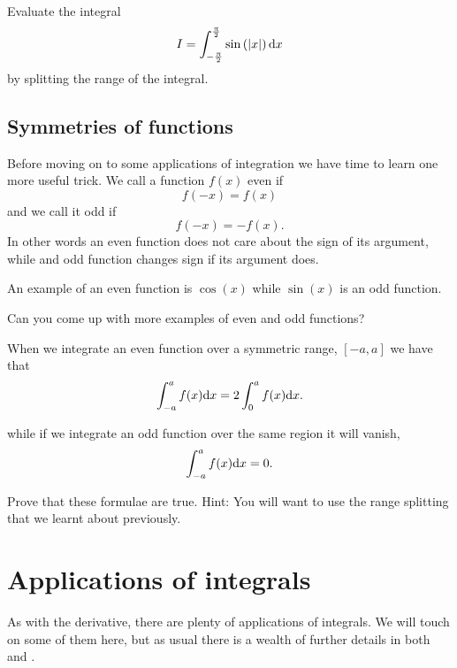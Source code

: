\begin{exercise}
Evaluate the integral
\begin{equation*}
I=\int_{-\frac{\uppi}{2}}^{\frac{\uppi}{2}}\sin\left(\vert x\vert\right)\mathrm{d} x
\end{equation*}
by splitting the range of the integral.
\end{exercise}

\subsection*{Symmetries of functions}
Before moving on to some applications of integration we have time to learn one more useful trick. We call a function $f(x)$ even if 
\begin{equation}
f(-x)=f(x)
\label{eq: even fn}
\end{equation}
and we call it odd if
\begin{equation}
f(-x)=-f(x).
\label{eq: odd fn}
\end{equation}
In other words an even function does not care about the sign of its argument, while and odd function changes sign if its argument does.

An example of an even function is $\cos(x)$ while $\sin(x)$ is an odd function.

\begin{exercise}
Can you come up with more examples of even and odd functions? 
\end{exercise}

When we integrate an even function over a symmetric range, $[-a,a]$ we have that 
\begin{equation}
\int_{-a}^{a}f(x)\mathrm{d} x=2\int_{0}^{a}f(x)\mathrm{d} x.
\end{equation}

while if we integrate an odd function over the same region it will vanish,
\begin{equation}
\int_{-a}^{a}f(x)\mathrm{d} x=0.
\end{equation}

\begin{exercise}
Prove that these formulae are true. Hint: You will want to use the range splitting that we learnt about  previously.
\end{exercise}




\section{Applications of integrals}
As with the derivative, there are plenty of applications of integrals. We will touch on some of them here, but as usual there is a wealth of further details in both \citep{calcI} and \citep{riley_mathematical_2006}.\\

